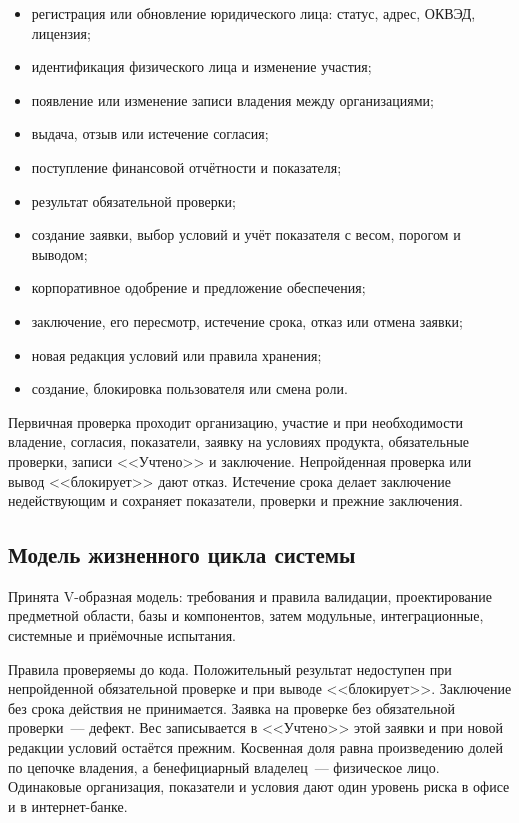 \begin{itemize}
\item регистрация или обновление юридического лица: статус, адрес, ОКВЭД, лицензия;
\item идентификация физического лица и изменение участия;
\item появление или изменение записи владения между организациями;
\item выдача, отзыв или истечение согласия;
\item поступление финансовой отчётности и показателя;
\item результат обязательной проверки;
\item создание заявки, выбор условий и учёт показателя с весом, порогом и выводом;
\item корпоративное одобрение и предложение обеспечения;
\item заключение, его пересмотр, истечение срока, отказ или отмена заявки;
\item новая редакция условий или правила хранения;
\item создание, блокировка пользователя или смена роли.
\end{itemize}

Первичная проверка проходит организацию, участие и при необходимости владение, согласия, показатели, заявку на условиях продукта, обязательные проверки, записи <<Учтено>> и заключение. Непройденная проверка или вывод <<блокирует>> дают отказ. Истечение срока делает заключение недействующим и сохраняет показатели, проверки и прежние заключения.

\subsection{Модель жизненного цикла системы}

Принята V-образная модель: требования и правила валидации, проектирование предметной области, базы и компонентов, затем модульные, интеграционные, системные и приёмочные испытания.

Правила проверяемы до кода. Положительный результат недоступен при непройденной обязательной проверке и при выводе <<блокирует>>. Заключение без срока действия не принимается. Заявка на проверке без обязательной проверки~--- дефект. Вес записывается в <<Учтено>> этой заявки и при новой редакции условий остаётся прежним. Косвенная доля равна произведению долей по цепочке владения, а бенефициарный владелец~--- физическое лицо. Одинаковые организация, показатели и условия дают один уровень риска в офисе и в интернет-банке.

